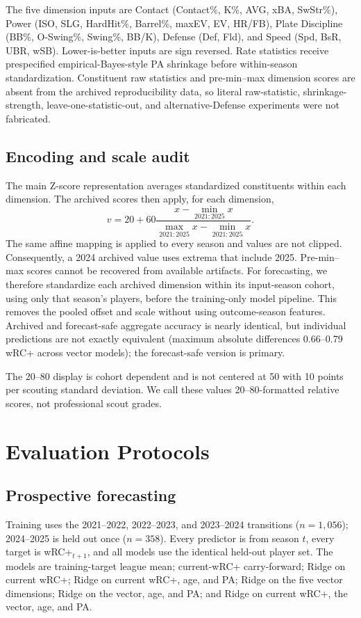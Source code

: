 \documentclass[10pt,twocolumn,letterpaper]{article}
\begin{document}
The five dimension inputs are Contact (Contact\%, K\%, AVG, xBA, SwStr\%), Power (ISO, SLG, HardHit\%, Barrel\%, maxEV, EV, HR/FB), Plate Discipline (BB\%, O-Swing\%, Swing\%, BB/K), Defense (Def, Fld), and Speed (Spd, BsR, UBR, wSB). Lower-is-better inputs are sign reversed. Rate statistics receive prespecified empirical-Bayes-style PA shrinkage before within-season standardization. Constituent raw statistics and pre-min--max dimension scores are absent from the archived reproducibility data, so literal raw-statistic, shrinkage-strength, leave-one-statistic-out, and alternative-Defense experiments were not fabricated.

\subsection{Encoding and scale audit}
The main Z-score representation averages standardized constituents within each dimension. The archived scores then apply, for each dimension,
\begin{equation}
v=20+60\frac{x-\min_{2021:2025}x}{\max_{2021:2025}x-\min_{2021:2025}x}.
\end{equation}
The same affine mapping is applied to every season and values are not clipped. Consequently, a 2024 archived value uses extrema that include 2025. Pre-min--max scores cannot be recovered from available artifacts. For forecasting, we therefore standardize each archived dimension within its input-season cohort, using only that season's players, before the training-only model pipeline. This removes the pooled offset and scale without using outcome-season features. Archived and forecast-safe aggregate accuracy is nearly identical, but individual predictions are not exactly equivalent (maximum absolute differences 0.66--0.79 wRC+ across vector models); the forecast-safe version is primary.

The 20--80 display is cohort dependent and is not centered at 50 with 10 points per scouting standard deviation. We call these values 20--80-formatted relative scores, not professional scout grades.

\section{Evaluation Protocols}
\subsection{Prospective forecasting}
Training uses the 2021--2022, 2022--2023, and 2023--2024 transitions ($n=1,056$); 2024--2025 is held out once ($n=358$). Every predictor is from season $t$, every target is wRC+$ _{t+1}$, and all models use the identical held-out player set. The models are training-target league mean; current-wRC+ carry-forward; Ridge on current wRC+; Ridge on current wRC+, age, and PA; Ridge on the five vector dimensions; Ridge on the vector, age, and PA; and Ridge on current wRC+, the vector, age, and PA.
\end{document}
